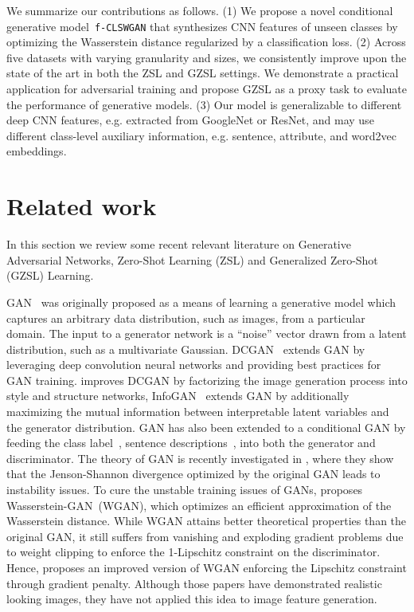 \documentclass[10pt,twocolumn,letterpaper]{article}
\newcommand{\myparagraph}[1]{\vspace{6pt}\noindent{\bf #1}}
\begin{document}
We summarize our contributions as follows.
(1) We propose a novel conditional generative model~\texttt{f-CLSWGAN} that synthesizes CNN features of unseen classes by optimizing the Wasserstein distance regularized by a classification loss. 
(2) Across five datasets with varying granularity and sizes, we consistently improve upon the state of the art in both the ZSL and GZSL settings. We demonstrate a practical application for adversarial training and propose GZSL as a proxy task to evaluate the performance of generative models.
(3) Our model is generalizable to different deep CNN features, e.g. extracted from GoogleNet or ResNet, and may use different class-level auxiliary information, e.g. sentence, attribute, and word2vec embeddings. 



\section{Related work}


In this section we review some recent relevant literature on Generative Adversarial Networks, Zero-Shot Learning (ZSL) and Generalized Zero-Shot (GZSL) Learning.

\myparagraph{Generative Adversarial Network.} GAN~\cite{GPMXWDOCB14}
was originally proposed as a means of learning a generative model
which captures an arbitrary data distribution,
such as images, from a particular domain.
The input to a generator network is a ``noise'' vector  drawn from a latent distribution, such as a multivariate Gaussian.
DCGAN~\cite{RMC16} extends GAN by leveraging deep convolution neural networks and providing best practices for GAN training. \cite{WG16} improves DCGAN by factorizing the image generation process into style and structure networks, InfoGAN~\cite{infogan} extends GAN by additionally maximizing the mutual information between interpretable latent variables and the generator distribution. 
GAN has also been extended to a  conditional GAN by feeding the class label~\cite{conditionalgans}, sentence descriptions~\cite{RAMSSL16,RAYLSL16,han2017stackgan}, into both the generator and discriminator. The theory of GAN is recently investigated in \cite{arjovsky2017towards,arjovsky2017wasserstein, gulrajani2017improved}, where they show that the Jenson-Shannon divergence optimized by the original GAN leads to instability issues. To cure the unstable training issues of GANs, \cite{arjovsky2017wasserstein} proposes Wasserstein-GAN~(WGAN), which optimizes an efficient approximation of the Wasserstein distance. While WGAN attains better theoretical properties than the original GAN, it still suffers from vanishing and exploding gradient problems due to weight clipping to enforce the 1-Lipschitz constraint on the discriminator. Hence, \cite{gulrajani2017improved} proposes an improved version of WGAN enforcing the Lipschitz constraint through gradient penalty. Although those papers have demonstrated realistic looking images, they have not applied this idea to image feature generation. 
\end{document}
